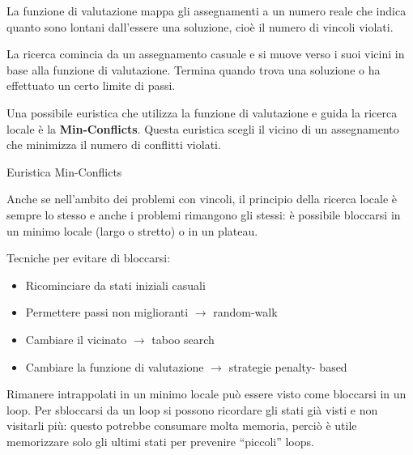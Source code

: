 La funzione di valutazione mappa gli assegnamenti a un numero reale che indica
quanto sono lontani dall'essere una soluzione, cioè il numero di vincoli
violati.

La ricerca comincia da un assegnamento casuale e si muove verso i suoi vicini
in base alla funzione di valutazione. Termina quando trova una soluzione o
ha effettuato un certo limite di passi.

Una possibile euristica che utilizza la funzione di valutazione e guida la
ricerca locale è la \textbf{Min-Conflicts}. Questa euristica scegli il vicino
di un assegnamento che minimizza il numero di conflitti violati.

\begin{algorithm}
    \caption{Euristica Min-Conflicts}
    \label{alg:minconflicts}
    \begin{algorithmic}[1]
              \EndIf
            \EndFor
        \EndProcedure
    \end{algorithmic}
\end{algorithm}

Anche se nell'ambito dei problemi con vincoli, il principio della ricerca
locale è sempre lo stesso e anche i problemi rimangono gli stessi:
è possibile bloccarsi in un minimo locale (largo o stretto) o in un plateau.

Tecniche per evitare di bloccarsi:

\begin{itemize}
 \item Ricominciare da stati iniziali casuali
 \item Permettere passi non miglioranti $\rightarrow$ random-walk
 \item Cambiare il vicinato $\rightarrow$ taboo search
 \item Cambiare la funzione di valutazione $\rightarrow$ strategie penalty-
based
\end{itemize}

Rimanere intrappolati in un minimo locale può essere visto come bloccarsi
in un loop. Per sbloccarsi da un loop si possono ricordare gli stati
già visti e non visitarli più: questo potrebbe consumare molta memoria,
perciò è utile memorizzare solo gli ultimi stati per prevenire ``piccoli''
loops.

